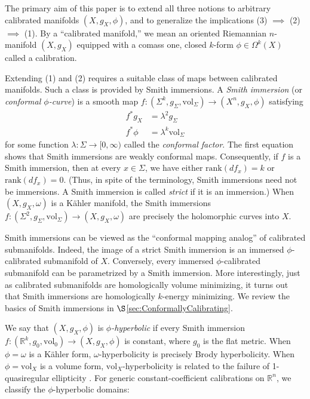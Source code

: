 \documentclass[11pt]{article}
\newcommand{\R}{\mathbb{R}}
\newcommand{\vol}{\mathrm{vol}}
\theoremstyle{definition}
\numberwithin{equation}{section}
\begin{document}
The primary aim of this paper is to extend all three notions to arbitrary calibrated manifolds $(X, g_X, \phi)$, and to generalize the implications (3) $\implies$ (2) $\implies$ (1).  By a ``calibrated manifold,” we mean an oriented Riemannian $n$-manifold $(X, g_X)$ equipped with a comass one, closed $k$-form $\phi \in \Omega^k(X)$ called a calibration.

Extending (1) and (2) requires a suitable class of maps between calibrated manifolds.  Such a class is provided by Smith immersions.  A \emph{Smith immersion} (or \emph{conformal $\phi$-curve}) is a smooth map $f \colon (\Sigma^k, g_\Sigma, \vol_\Sigma) \to (X^n, g_X, \phi)$ satisfying
\begin{align*}
f^*g_X & = \lambda^2 g_\Sigma \\
f^*\phi & = \lambda^k \vol_\Sigma
\end{align*}
for some function $\lambda \colon \Sigma \to [0,\infty)$ called the \emph{conformal factor}.  The first equation shows that Smith immersions are weakly conformal maps.  Consequently, if $f$ is a Smith immersion, then at every $x \in \Sigma$, we have either $\mathrm{rank}(df_x) = k$ or $\mathrm{rank}(df_x) = 0$.  (Thus, in spite of the terminology, Smith immersions need not be immersions.  A Smith immersion is called \emph{strict} if it is an immersion.)  When $(X, g_X, \omega)$ is a K\"{a}hler manifold, the Smith immersions $f \colon (\Sigma^2, g_\Sigma, \vol_\Sigma) \to (X, g_X, \omega)$ are precisely the holomorphic curves into $X$.

Smith immersions can be viewed as the ``conformal mapping analog” of calibrated submanifolds.  Indeed, the image of a strict Smith immersion is an immersed $\phi$-calibrated submanifold of $X$.  Conversely, every immersed $\phi$-calibrated submanifold can be parametrized by a Smith immersion.  More interestingly, just as calibrated submanifolds are homologically volume minimizing, it turns out that Smith immersions are homologically $k$-energy minimizing.  We review the basics of Smith immersions in $\S$\ref{sec:ConformallyCalibrating}.

We say that $(X, g_X, \phi)$ is \emph{$\phi$-hyperbolic} if every Smith immersion $f \colon (\R^k, g_0, \vol_0) \to (X, g_X, \phi)$ is constant, where $g_0$ is the flat metric.  When $\phi = \omega$ is a K\"{a}hler form, $\omega$-hyperbolicity is precisely Brody hyperbolicity.  When $\phi = \vol_X$ is a volume form, $\vol_X$-hyperbolicity is related to the failure of 1-quasiregular ellipticity \cite{bonk2001quasiregular}.  For generic constant-coefficient calibrations on $\R^n$, we classify the $\phi$-hyperbolic domains:
\end{document}
